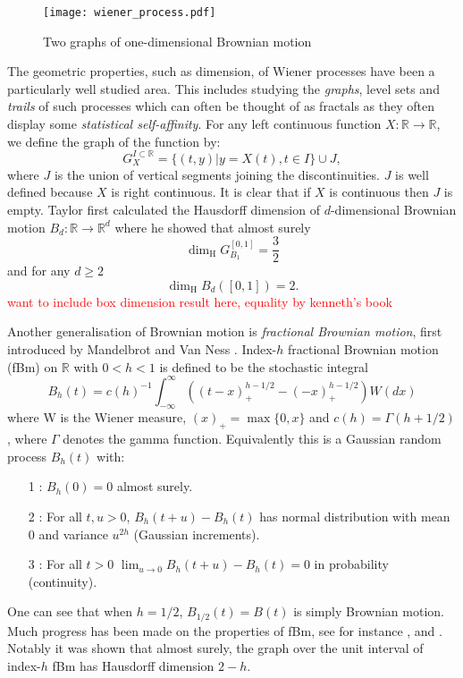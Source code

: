 \begin{figure}[h]
	\texttt{[image: wiener\_process.pdf]}
	\caption{\label{fig:brownianmotion}Two graphs of one-dimensional Brownian motion}
\end{figure}

The geometric properties, such as dimension, of Wiener processes have been a particularly well studied area. This includes studying the \emph{graphs}, level sets and \emph{trails} of such processes which can often be thought of as fractals as they often display some \emph{statistical self-affinity}. For any left continuous function $X:\mathbb{R}\to\mathbb{R}$, we define the graph of the function by:
\[
G^{I\subset\mathbb{R}}_{X}=\{(t,y)|y=X(t),t\in I\}\cup J,
\]
where $J$ is the union of vertical segments joining the discontinuities. $J$ is well defined because $X$ is right continuous. It is clear that if $X$ is continuous then $J$ is empty. Taylor \cite{Ta} first calculated the Hausdorff dimension of $d$-dimensional Brownian motion $B_d:\mathbb{R}\to\mathbb{R}^d$ where he showed that almost surely
\[
\dim_\text{H} G_{B_1}^{[0,1]} =  \frac{3}{2}         
\]
and for any $d\ge 2$
\[
\dim_\text{H} B_d([0,1]) =  2.
\]
\textcolor{red}{want to include box dimension result here, equality by kenneth's book}


Another generalisation of Brownian motion is \emph{fractional Brownian motion}, first introduced by Mandelbrot and Van Ness \cite{MVN}. Index-$h$ fractional Brownian motion (fBm) on $\mathbb{R}$ with $0<h<1$ is defined to be the stochastic integral 
\[
B_h (t) = c(h)^{-1} \int_{-\infty}^\infty \left(\left( t-x \right)_+^{h-1/2} - (-x)_+^{h-1/2} \right)W(dx)
\]
where W is the Wiener measure, $(x)_+ = \max\{0,x\}$ and $c(h) = \Gamma(h+1/2)$, where $\Gamma$ denotes the gamma function. Equivalently this is a Gaussian random process $B_h(t)$ with:
\begin{itemize}
	\item[1]: $B_h(0)=0$ almost surely.
	\item[2]: For all $t,u>0$, $B_h(t+u)-B_h(t)$ has normal distribution with mean 0 and variance $u^{2h}$ (Gaussian increments).
	\item[3]: For all $t>0$ $\lim_{u\to 0} B_h(t+u)-B_h(t)=0$ in probability (continuity).
\end{itemize}
One can see that when $h=1/2$, $B_{1/2}(t) = B(t)$ is simply Brownian motion. Much progress has been made on the properties of fBm, see for instance \cite{Ad},\cite{Ka} and \cite{Fa2}. Notably it was shown that almost surely, the graph over the unit interval of index-$h$ fBm has Hausdorff dimension $2-h$. 

